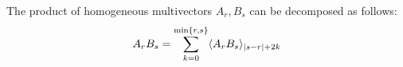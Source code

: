 \begin{theorem}\label{t:homog-product}
	The product of homogeneous multivectors $A_r, B_s$ can be decomposed as follows:
	\[A_rB_s = \sum_{k=0}^{\min\{r,s\}} \langle A_rB_s \rangle_{\left|s-r\right|+2k}\]
\end{theorem}
